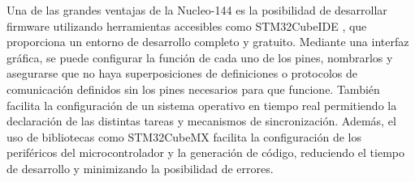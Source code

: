 Una de las grandes ventajas de la Nucleo-144 es la posibilidad de desarrollar firmware utilizando herramientas accesibles como STM32CubeIDE \cite{stCubeIde}, que proporciona un entorno de desarrollo completo y gratuito. Mediante una interfaz gráfica, se puede configurar la función de cada uno de los pines, nombrarlos y asegurarse que no haya superposiciones de definiciones o protocolos de comunicación definidos sin los pines necesarios para que funcione. También facilita la configuración de un sistema operativo en tiempo real permitiendo la declaración de las distintas tareas y mecanismos de sincronización. Además, el uso de bibliotecas como STM32CubeMX \cite{stCubeMx} facilita la configuración de los periféricos del microcontrolador y la generación de código, reduciendo el tiempo de desarrollo y minimizando la posibilidad de errores. 


